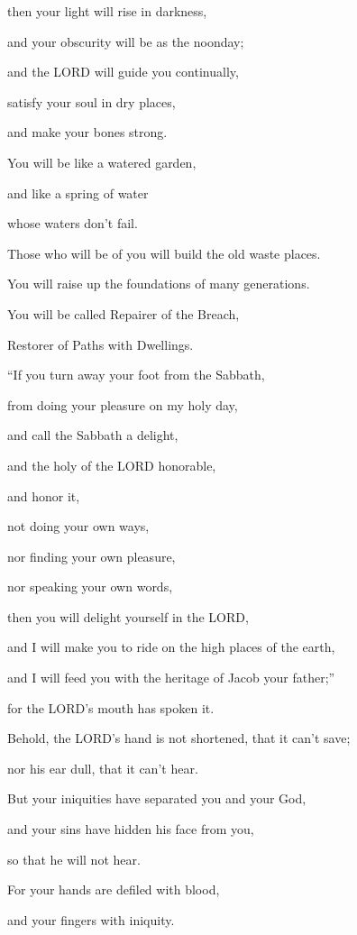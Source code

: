then your light will rise in darkness,

and your obscurity will be as the noonday;

\myverse{}and the LORD will guide you continually,

satisfy your soul in dry places,

and make your bones strong.

You will be like a watered garden,

and like a spring of water

whose waters don’t fail.

\myverse{}Those who will be of you will build the old waste places.

You will raise up the foundations of many generations.

You will be called Repairer of the Breach,

Restorer of Paths with Dwellings.


\vspace{\baselineskip} \myverse{}“If you turn away your foot from the Sabbath,

from doing your pleasure on my holy day,

and call the Sabbath a delight,

and the holy of the LORD honorable,

and honor it,

not doing your own ways,

nor finding your own pleasure,

nor speaking your own words,

\myverse{}then you will delight yourself in the LORD,

and I will make you to ride on the high places of the earth,

and I will feed you with the heritage of Jacob your father;”

for the LORD’s mouth has spoken it.


\mychapter{} \myverse*{}Behold, the LORD’s hand is not shortened, that it can’t save;

\quad\quad nor his ear dull, that it can’t hear.

\myverse{}But your iniquities have separated you and your God,

and your sins have hidden his face from you,

so that he will not hear.

\myverse{}For your hands are defiled with blood,

and your fingers with iniquity.

